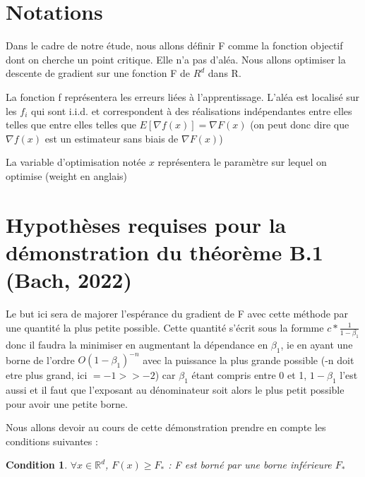 \documentclass{article}
\begin{document}
\bigskip

\section{Notations}

\bigskip

Dans le cadre de notre étude, nous allons définir F comme la fonction objectif dont on cherche un point critique. Elle n'a pas d'aléa. Nous allons optimiser la descente de gradient sur une fonction F de $R^d$ dans R. 

\bigskip

La fonction f représentera les erreurs liées à l'apprentissage. L'aléa est localisé sur les $f_i$ qui sont i.i.d. et correspondent à des réalisations indépendantes entre elles telles que entre elles telles que $E [ \nabla f(x)] = \nabla F(x)$ (on peut donc dire que $\nabla f(x)$ est un estimateur sans biais de $\nabla F(x)$)

\bigskip

La variable d'optimisation notée $x$ représentera le paramètre sur lequel on optimise (weight en anglais)

\bigskip

\section{Hypothèses requises pour la démonstration du théorème B.1 (Bach, 2022)}

Le but ici sera de majorer l'espérance du gradient de F avec cette méthode par une quantité la plus petite possible. Cette quantité s'écrit sous la formme $c*\frac{1}{1-\beta_1}$ donc il faudra la minimiser en augmentant la dépendance en $\beta_1$, ie en ayant une borne de l'ordre $O(1-\beta_1)^{-n}$ avec la puissance la plus grande possible (-n doit etre plus grand, ici $=-1 >> -2$) car $\beta_1$ étant compris entre 0 et 1, $1-\beta_1$ l'est aussi et il faut que l'exposant au dénominateur soit alors le plus petit possible pour avoir une petite borne.

\bigskip

Nous allons devoir au cours de cette démonstration prendre en compte les conditions suivantes :

\bigskip

\newtheorem{assumption}{Condition}
\begin{assumption}

$\forall x \in \mathbb{R}^d$, $F(x)\geq F_* $ : F est borné par une borne inférieure $F_*$ 
\begin{equation}
    \label{eq:C1}
\end{equation}
\end{assumption}
\end{document}
